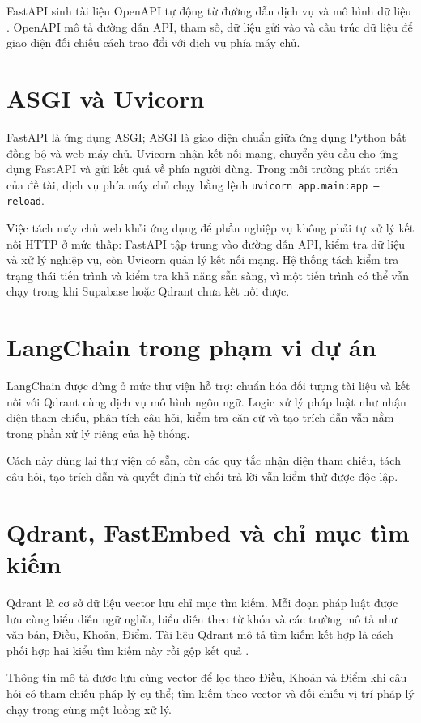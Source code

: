 \documentclass[12pt,a4paper,oneside]{report}
\begin{document}
FastAPI sinh tài liệu OpenAPI tự động từ đường dẫn dịch vụ và mô hình dữ liệu \cite{fastapi_docs}. OpenAPI mô tả đường dẫn API, tham số, dữ liệu gửi vào và cấu trúc dữ liệu để giao diện đối chiếu cách trao đổi với dịch vụ phía máy chủ.

\section{ASGI và Uvicorn}
FastAPI là ứng dụng ASGI; ASGI là giao diện chuẩn giữa ứng dụng Python bất đồng bộ và web máy chủ. Uvicorn nhận kết nối mạng, chuyển yêu cầu cho ứng dụng FastAPI và gửi kết quả về phía người dùng. Trong môi trường phát triển của đề tài, dịch vụ phía máy chủ chạy bằng lệnh \texttt{uvicorn app.main:app --reload}.

Việc tách máy chủ web khỏi ứng dụng để phần nghiệp vụ không phải tự xử lý kết nối HTTP ở mức thấp: FastAPI tập trung vào đường dẫn API, kiểm tra dữ liệu và xử lý nghiệp vụ, còn Uvicorn quản lý kết nối mạng. Hệ thống tách kiểm tra trạng thái tiến trình và kiểm tra khả năng sẵn sàng, vì một tiến trình có thể vẫn chạy trong khi Supabase hoặc Qdrant chưa kết nối được.

\section{LangChain trong phạm vi dự án}
LangChain được dùng ở mức thư viện hỗ trợ: chuẩn hóa đối tượng tài liệu và kết nối với Qdrant cùng dịch vụ mô hình ngôn ngữ. Logic xử lý pháp luật như nhận diện tham chiếu, phân tích câu hỏi, kiểm tra căn cứ và tạo trích dẫn vẫn nằm trong phần xử lý riêng của hệ thống.

Cách này dùng lại thư viện có sẵn, còn các quy tắc nhận diện tham chiếu, tách câu hỏi, tạo trích dẫn và quyết định từ chối trả lời vẫn kiểm thử được độc lập.

\section{Qdrant, FastEmbed và chỉ mục tìm kiếm}
Qdrant là cơ sở dữ liệu vector lưu chỉ mục tìm kiếm. Mỗi đoạn pháp luật được lưu cùng biểu diễn ngữ nghĩa, biểu diễn theo từ khóa và các trường mô tả như văn bản, Điều, Khoản, Điểm. Tài liệu Qdrant mô tả tìm kiếm kết hợp là cách phối hợp hai kiểu tìm kiếm này rồi gộp kết quả \cite{qdrant_hybrid_docs}.

Thông tin mô tả được lưu cùng vector để lọc theo Điều, Khoản và Điểm khi câu hỏi có tham chiếu pháp lý cụ thể; tìm kiếm theo vector và đối chiếu vị trí pháp lý chạy trong cùng một luồng xử lý.
\end{document}
